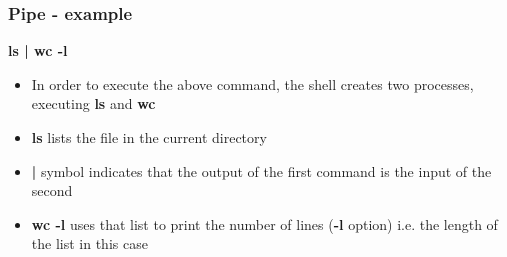 \documentclass{beamer}
\begin{document}
\begin{frame}
\frametitle{Pipe - example}
\textbf{ls | wc -l}
\begin{itemize}
\item In order to execute the above command, the shell creates two processes, executing \textbf{ls} and \textbf{wc}
\item \textbf{ls} lists the file in the current directory
\item \textbf{|} symbol indicates that the output of the first command is the input of the second
\item \textbf{wc -l} uses that list to print the number of lines (\textbf{-l} option) i.e. the length of the list in this case 
\end{itemize}
\end{frame}
\end{document}
